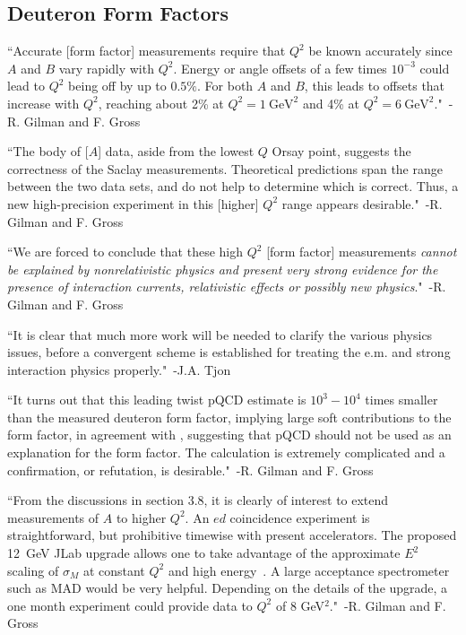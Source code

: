 


\subsection{Deuteron Form Factors}

``Accurate [form factor] measurements require that $Q^2$ be known accurately since $A$ and $B$ vary rapidly with $Q^2$. Energy or angle offsets of a few times $10^{-3}$ could lead to $Q^2$ being off by up to $0.5\%$. For both $A$ and $B$, this leads to offsets that increase with $Q^2$, reaching about 2\% at $Q^2=1\mathrm{~GeV}^2$ and 4\% at $Q^2=6\mathrm{~GeV}^2$."~-R. Gilman and F. Gross~\cite{Gilman:2001yh}

``The body of [$A$] data, aside from the lowest $Q$ Orsay point, suggests the correctness of the Saclay measurements. Theoretical predictions span the range between the two data sets, and do not help to determine which is correct. Thus, a new high-precision experiment in this [higher] $Q^2$ range appears desirable."~-R. Gilman and F. Gross~\cite{Gilman:2001yh}

``We are forced to conclude that these high $Q^2$ [form factor] measurements \emph{cannot be explained by nonrelativistic physics and present very strong evidence for the presence of interaction currents, relativistic effects or possibly new physics}."~-R. Gilman and F. Gross~\cite{Gilman:2001yh}

``It is clear that much more work will be needed to clarify the various physics issues, before a convergent scheme is established for treating the e.m. and strong interaction physics properly."~-J.A. Tjon~\cite{Tjon.48218}

``It turns out that this leading twist pQCD estimate is $10^3-10^4$ times smaller than the measured deuteron form factor, implying large soft contributions to the form factor, in agreement with \cite{Isgur:1988iw,Radyushkin:1990te}, suggesting that pQCD should not be used as an explanation for the form factor. The calculation is extremely complicated and a confirmation, or refutation, is desirable."~-R. Gilman and F. Gross~\cite{Gilman:2001yh}

``From the discussions in section 3.8, it is clearly of interest to extend measurements of $A$ to higher $Q^2$. An $ed$ coincidence experiment is straightforward, but prohibitive timewise with present accelerators. The proposed 12~GeV JLab upgrade allows one to take advantage of the approximate $E^2$ scaling of $\sigma_M$ at constant $Q^2$ and high energy~\cite{Petratos:2002wz}. A large acceptance spectrometer such as MAD would be very helpful. Depending on the details of the upgrade, a one month experiment could provide data to $Q^2$ of 8 GeV$^2$."~-R. Gilman and F. Gross~\cite{Gilman:2001yh}


